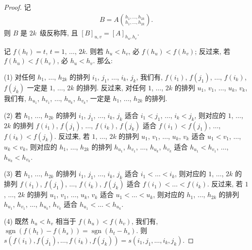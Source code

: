 \documentclass[../libro]{subfiles}
\begin{document}
\begin{proof}
    记
    \begin{align*}
        B = A\binom{h_1,\dots,h_{2k}}{h_1,\dots,h_{2k}}.
    \end{align*}
    则 \(B\) 是 \(2k\)~级反称阵,
    且 \([B]_{u,v} = [A]_{h_u,h_v}\).

    记 \(f(h_t) = t\), \(t = 1\), \(\dots\), \(2k\).
    则若 \(h_u < h_v\), 必 \(f(h_u) < f(h_v)\);
    反过来, 若 \(f(h_u) < f(h_v)\), 必 \(h_u < h_v\).
    那么:

    (1)
    对任何 \(h_1\), \(\dots\), \(h_{2k}\) 的排列
    \(i_1\), \(j_1\), \(\dots\), \(i_k\), \(j_k\),
    我们有,
    \(f(i_1)\), \(f(j_1)\), \(\dots\), \(f(i_k)\), \(f(j_k)\)
    一定是 \(1\), \(\dots\), \(2k\) 的排列.
    反过来, 对任何 \(1\), \(\dots\), \(2k\) 的排列
    \(u_1\), \(v_1\), \(\dots\), \(u_k\), \(v_k\),
    我们有,
    \(h_{u_1}\), \(h_{v_1}\), \(\dots\), \(h_{u_k}\), \(h_{v_k}\),
    一定是 \(h_1\), \(\dots\), \(h_{2k}\) 的排列.

    (2)
    若 \(h_1\), \(\dots\), \(h_{2k}\) 的排列
    \(i_1\), \(j_1\), \(\dots\), \(i_k\), \(j_k\)
    适合
    \(i_1 < j_1\), \(\dots\), \(i_k < j_k\),
    则对应的 \(1\), \(\dots\), \(2k\) 的排列
    \(f(i_1)\), \(f(j_1)\), \(\dots\), \(f(i_k)\), \(f(j_k)\)
    适合
    \(f(i_1) < f(j_1)\), \(\dots\), \(f(i_k) < f(j_k)\).
    反过来, 若 \(1\), \(\dots\), \(2k\) 的排列
    \(u_1\), \(v_1\), \(\dots\), \(u_k\), \(v_k\)
    适合
    \(u_1 < v_1\), \(\dots\), \(u_k < v_k\),
    则对应的 \(h_1\), \(\dots\), \(h_{2k}\) 的排列
    \(h_{u_1}\), \(h_{v_1}\), \(\dots\), \(h_{u_k}\), \(h_{v_k}\)
    适合
    \(h_{u_1} < h_{v_1}\), \(\dots\), \(h_{u_k} < h_{v_k}\).

    (3)
    若 \(h_1\), \(\dots\), \(h_{2k}\) 的排列
    \(i_1\), \(j_1\), \(\dots\), \(i_k\), \(j_k\)
    适合
    \(i_1 < \dots < i_k\),
    则对应的 \(1\), \(\dots\), \(2k\) 的排列
    \(f(i_1)\), \(f(j_1)\), \(\dots\), \(f(i_k)\), \(f(j_k)\)
    适合
    \(f(i_1) < \dots < f(i_k)\).
    反过来, 若 \(1\), \(\dots\), \(2k\) 的排列
    \(u_1\), \(v_1\), \(\dots\), \(u_k\), \(v_k\)
    适合
    \(u_1 < \dots < u_k\),
    则对应的 \(h_1\), \(\dots\), \(h_{2k}\) 的排列
    \(h_{u_1}\), \(h_{v_1}\), \(\dots\), \(h_{u_k}\), \(h_{v_k}\)
    适合
    \(h_{u_1} < \dots < h_{u_k}\).

    (4)
    既然 \(h_u < h_v\) 相当于 \(f(h_u) < f(h_v)\),
    我们有,
    \(\operatorname{sgn} {(f(h_t) - f(h_s))}
    = \operatorname{sgn} {(h_t - h_s)}\).
    则
    \(s(f(i_1), f(j_1), \dots, f(i_k), f(j_k))
    = s(i_1, j_1, \dots, i_k, j_k)\).


\end{proof}
\end{document}
